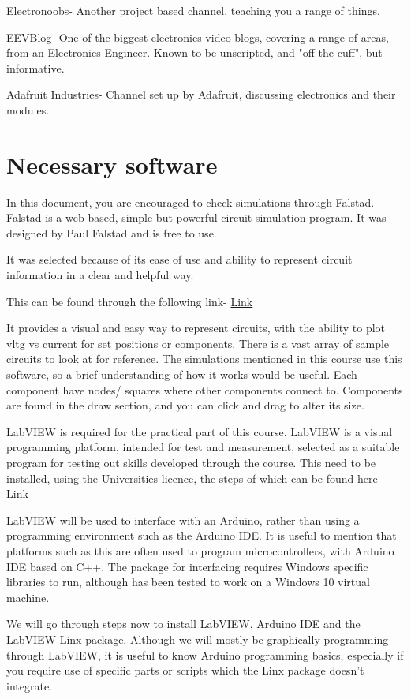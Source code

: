 \documentclass[a4paper,11pt]{report}
\begin{document}
Electronoobs- Another project based channel, teaching you a range of things.

EEVBlog- One of the biggest electronics video blogs, covering a range of areas, from an Electronics Engineer. Known to be unscripted, and "off-the-cuff", but informative.

Adafruit Industries- Channel set up by Adafruit, discussing electronics and their modules.

\section{Necessary software}

In this document, you are encouraged to check simulations through Falstad. Falstad is a web-based, simple but powerful circuit simulation program. It was designed by Paul Falstad and is free to use.

It was selected because of its ease of use and ability to represent circuit information in a clear and helpful way.

This can be found through the following link- \href{https://falstad.com/circuit/}{Link}

It provides a visual and easy way to represent circuits, with the ability to plot \gls{vltg} vs current for set positions or components. There is a vast array of sample circuits to look at for reference. The simulations mentioned in this course use this software, so a brief understanding of how it works would be useful. Each component have nodes/ squares where other components connect to. Components are found in the draw section, and you can click and drag to alter its size.

LabVIEW is required for the practical part of this course. LabVIEW is a visual programming platform, intended for test and measurement, selected as a suitable program for testing out skills developed through the course. This need to be installed, using the Universities licence, the steps of which can be found here- \href{https://www.york.ac.uk/it-services/software/a-z/labview/#tab-2}{Link}

LabVIEW will be used to interface with an Arduino, rather than using a programming environment such as the Arduino IDE. It is useful to mention that platforms such as this are often used to program microcontrollers, with Arduino IDE based on C++. The package for interfacing requires Windows specific libraries to run, although has been tested to work on a Windows 10 virtual machine.

We will go through steps now to install LabVIEW, Arduino IDE and the LabVIEW Linx package. Although we will mostly be graphically programming through LabVIEW, it is useful to know Arduino programming basics, especially if you require use of specific parts or scripts which the Linx package doesn't integrate.
\end{document}
